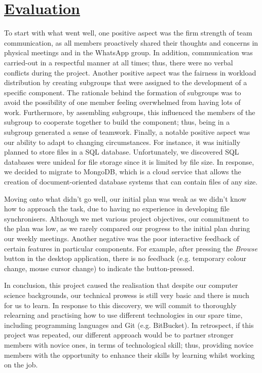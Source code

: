 \documentclass{article}
\begin{document}
\section{\underline{Evaluation}}
To start with what went well, one positive aspect was the firm strength of team communication, as all members proactively shared their thoughts and concerns in physical meetings and in the WhatsApp group. In addition, communication was carried-out in a respectful manner at all times; thus, there were no verbal conflicts during the project. Another positive aspect was the fairness in workload distribution by creating subgroups that were assigned to the development of a specific component. The rationale behind the formation of subgroups was to avoid the possibility of one member feeling overwhelmed from having lots of work. Furthermore, by assembling subgroups, this influenced the members of the subgroup to cooperate together to build the component; thus, being in a subgroup generated a sense of teamwork. Finally, a notable positive aspect was our ability to adapt to changing circumstances. For instance, it was initially planned to store files in a SQL database. Unfortunately, we discovered SQL databases were unideal for file storage since it is limited by file size. In response, we decided to migrate to MongoDB, which is a cloud service that allows the creation of document-oriented database systems that can contain files of any size. 

\noindent Moving onto what didn't go well, our initial plan was weak as we didn't know how to approach the task, due to having no experience in developing file synchronisers. Although we met various project objectives, our commitment to the plan was low, as we rarely compared our progress to the initial plan during our weekly meetings. Another negative was the poor interactive feedback of certain features in particular components. For example, after pressing the \textit{Browse} button in the desktop application, there is no feedback (e.g. temporary colour change, mouse cursor change) to indicate the button-pressed. 

\noindent In conclusion, this project caused the realisation that despite our computer science backgrounds, our technical prowess is still very basic and there is much for us to learn. In response to this discovery, we will commit to thoroughly relearning and practising how to use different technologies in our spare time, including programming languages and Git (e.g. BitBucket). In retrospect, if this project was repeated, our different approach would be to partner stronger members with novice ones, in terms of technological skill; thus, providing novice members with the opportunity to enhance their skills by learning whilst working on the job.   
\end{document}
